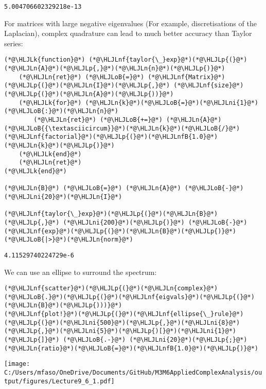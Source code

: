 \documentclass[12pt,a4paper]{article}
\newcommand{\HLJLk}[1]{\textcolor[RGB]{148,91,176}{\textbf{#1}}}
\newcommand{\HLJLn}[1]{#1}
\newcommand{\HLJLnf}[1]{\textcolor[RGB]{66,102,213}{#1}}
\newcommand{\HLJLnfB}[1]{\textcolor[RGB]{59,151,46}{#1}}
\newcommand{\HLJLni}[1]{\textcolor[RGB]{59,151,46}{#1}}
\newcommand{\HLJLoB}[1]{\textcolor[RGB]{102,102,102}{\textbf{#1}}}
\newcommand{\HLJLp}[1]{#1}
\begin{document}
\begin{lstlisting}
5.004706602329218e-13
\end{lstlisting}


For matrices with large negative eigenvalues (For example, discretisations of the Laplacian), complex quadrature can lead to much better accuracy than Taylor series:


\begin{lstlisting}
(*@\HLJLk{function}@*) (*@\HLJLnf{taylor{\_}exp}@*)(*@\HLJLp{(}@*)(*@\HLJLn{A}@*)(*@\HLJLp{,}@*)(*@\HLJLn{n}@*)(*@\HLJLp{)}@*)
    (*@\HLJLn{ret}@*) (*@\HLJLoB{=}@*) (*@\HLJLnf{Matrix}@*)(*@\HLJLp{(}@*)(*@\HLJLn{I}@*)(*@\HLJLp{,}@*) (*@\HLJLnf{size}@*)(*@\HLJLp{(}@*)(*@\HLJLn{A}@*)(*@\HLJLp{))}@*)
    (*@\HLJLk{for}@*) (*@\HLJLn{k}@*)(*@\HLJLoB{=}@*)(*@\HLJLni{1}@*)(*@\HLJLoB{:}@*)(*@\HLJLn{n}@*)
        (*@\HLJLn{ret}@*) (*@\HLJLoB{+=}@*) (*@\HLJLn{A}@*)(*@\HLJLoB{{\textasciicircum}}@*)(*@\HLJLn{k}@*)(*@\HLJLoB{/}@*)(*@\HLJLnf{factorial}@*)(*@\HLJLp{(}@*)(*@\HLJLnfB{1.0}@*)(*@\HLJLn{k}@*)(*@\HLJLp{)}@*)
    (*@\HLJLk{end}@*)
    (*@\HLJLn{ret}@*)
(*@\HLJLk{end}@*)

(*@\HLJLn{B}@*) (*@\HLJLoB{=}@*) (*@\HLJLn{A}@*) (*@\HLJLoB{-}@*) (*@\HLJLni{20}@*)(*@\HLJLn{I}@*)

(*@\HLJLnf{taylor{\_}exp}@*)(*@\HLJLp{(}@*)(*@\HLJLn{B}@*)(*@\HLJLp{,}@*) (*@\HLJLni{200}@*)(*@\HLJLp{)}@*) (*@\HLJLoB{-}@*)(*@\HLJLnf{exp}@*)(*@\HLJLp{(}@*)(*@\HLJLn{B}@*)(*@\HLJLp{)}@*) (*@\HLJLoB{|>}@*)(*@\HLJLn{norm}@*)
\end{lstlisting}

\begin{lstlisting}
4.11529740224729e-6
\end{lstlisting}


We can use an ellipse to surround the spectrum:


\begin{lstlisting}
(*@\HLJLnf{scatter}@*)(*@\HLJLp{(}@*)(*@\HLJLn{complex}@*)(*@\HLJLoB{.}@*)(*@\HLJLp{(}@*)(*@\HLJLnf{eigvals}@*)(*@\HLJLp{(}@*)(*@\HLJLn{B}@*)(*@\HLJLp{)))}@*)
(*@\HLJLnf{plot!}@*)(*@\HLJLp{(}@*)(*@\HLJLnf{ellipse{\_}rule}@*)(*@\HLJLp{(}@*)(*@\HLJLni{500}@*)(*@\HLJLp{,}@*)(*@\HLJLni{8}@*)(*@\HLJLp{,}@*)(*@\HLJLni{5}@*)(*@\HLJLp{)[}@*)(*@\HLJLni{1}@*)(*@\HLJLp{]}@*) (*@\HLJLoB{.-}@*) (*@\HLJLni{20}@*)(*@\HLJLp{;}@*)(*@\HLJLn{ratio}@*)(*@\HLJLoB{=}@*)(*@\HLJLnfB{1.0}@*)(*@\HLJLp{)}@*)
\end{lstlisting}

\texttt{[image: C:/Users/mfaso/OneDrive/Documents/GitHub/M3M6AppliedComplexAnalysis/output/figures/Lecture9\_6\_1.pdf]}
\end{document}
